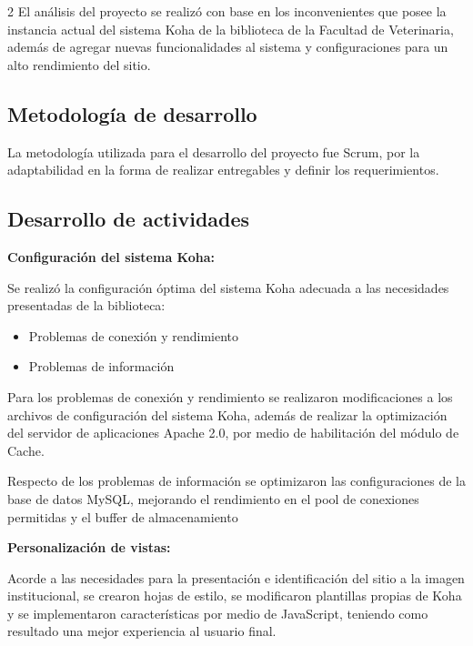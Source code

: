 \documentclass[12pt,spanish,Letterpaper,openany]{book}
\providecommand{\tightlist}{%
  \setlength{\itemsep}{0pt}\setlength{\parskip}{0pt}}
\begin{document}
\begin {multicols}{2}
El análisis del proyecto se realizó con base en los inconvenientes que posee la instancia actual del sistema Koha de la biblioteca de la Facultad de Veterinaria, además de agregar nuevas funcionalidades al sistema y configuraciones para un alto rendimiento del sitio.

\hypertarget{metodologuxeda-de-desarrollo}{%
\subsection{Metodología de desarrollo}\label{metodologuxeda-de-desarrollo}}

La metodología utilizada para el desarrollo del proyecto fue Scrum, por la adaptabilidad en la forma de realizar entregables y definir los requerimientos.

\hypertarget{desarrollo-de-actividades}{%
\subsection{Desarrollo de actividades}\label{desarrollo-de-actividades}}

\textbf{Configuración del sistema Koha:}

Se realizó la configuración óptima del sistema Koha adecuada a las necesidades presentadas de la biblioteca:

\begin{itemize}
\tightlist
\item
  Problemas de conexión y rendimiento
\item
  Problemas de información
\end{itemize}

Para los problemas de conexión y rendimiento se realizaron modificaciones a los archivos de configuración del sistema Koha, además de realizar la optimización del servidor de aplicaciones Apache 2.0, por medio de habilitación del módulo de Cache.

Respecto de los problemas de información se optimizaron las configuraciones de la base de datos MySQL, mejorando el rendimiento en el pool de conexiones permitidas y el buffer de almacenamiento

\textbf{Personalización de vistas:}

Acorde a las necesidades para la presentación e identificación del sitio a la imagen institucional, se crearon hojas de estilo, se modificaron plantillas propias de Koha y se implementaron características por medio de JavaScript, teniendo como resultado una mejor experiencia al usuario final.


\end{multicols}
\end{document}
